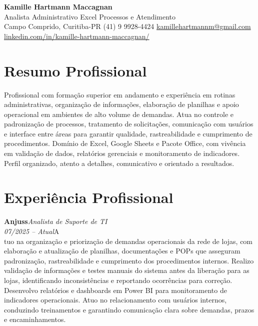 \documentclass[11pt,a4paper]{article}
\newcommand{\cvrole}[4]{%
  \vspace{4pt}%
  {\bfseries\color{accentcolor}#1}\hfill{\itshape #2}\\[-2pt]%
  {\itshape #3}\hfill #4\\[6pt]%
}
\begin{document}
\begin{center}
  {\fontsize{20}{24}\selectfont\bfseries Kamille Hartmann Maccagnan}\\[8pt]
  {\large Analista Administrativo \textbar{} Excel \textbar{} Processos e Atendimento}\\[10pt]
  Campo Comprido, Curitiba-PR \enspace\textbullet\enspace (41) 9 9928-4424 \enspace\textbullet\enspace
  \href{mailto:kamillehartmannm@gmail.com}{kamillehartmannm@gmail.com}\\[3pt]
  \href{https://linkedin.com/in/kamille-hartmann-maccagnan/}{linkedin.com/in/kamille-hartmann-maccagnan/}
\end{center}

\vspace{6pt}

\section{Resumo Profissional}

Profissional com formação superior em andamento e experiência em rotinas administrativas, organização de informações, elaboração de planilhas e apoio operacional em ambientes de alto volume de demandas. Atua no controle e padronização de processos, tratamento de solicitações, comunicação com usuários e interface entre áreas para garantir qualidade, rastreabilidade e cumprimento de procedimentos. Domínio de Excel, Google Sheets e Pacote Office, com vivência em validação de dados, relatórios gerenciais e monitoramento de indicadores. Perfil organizado, atento a detalhes, comunicativo e orientado a resultados.

\section{Experiência Profissional}

\cvrole{Anjuss}{Analista de Suporte de TI}{07/2025 -- Atual}

Atuo na organização e priorização de demandas operacionais da rede de lojas, com elaboração e atualização de planilhas, documentações e POPs que asseguram padronização, rastreabilidade e cumprimento dos procedimentos internos. Realizo validação de informações e testes manuais do sistema antes da liberação para as lojas, identificando inconsistências e reportando ocorrências para correção. Desenvolvo relatórios e dashboards em Power BI para monitoramento de indicadores operacionais. Atuo no relacionamento com usuários internos, conduzindo treinamentos e garantindo comunicação clara sobre demandas, prazos e encaminhamentos.
\end{document}
